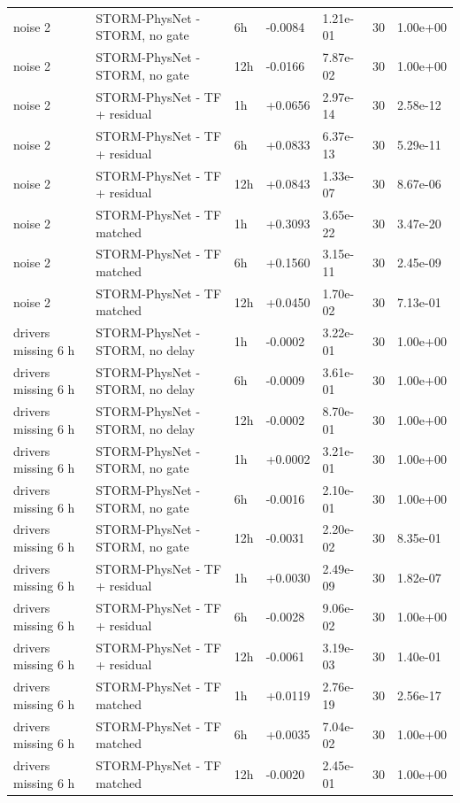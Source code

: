 \begin{tabular}{lllllrl}
noise 2 & STORM-PhysNet - STORM, no gate & 6h & -0.0084 & 1.21e-01 & 30 & 1.00e+00 \\
noise 2 & STORM-PhysNet - STORM, no gate & 12h & -0.0166 & 7.87e-02 & 30 & 1.00e+00 \\
noise 2 & STORM-PhysNet - TF + residual & 1h & +0.0656 & 2.97e-14 & 30 & 2.58e-12 \\
noise 2 & STORM-PhysNet - TF + residual & 6h & +0.0833 & 6.37e-13 & 30 & 5.29e-11 \\
noise 2 & STORM-PhysNet - TF + residual & 12h & +0.0843 & 1.33e-07 & 30 & 8.67e-06 \\
noise 2 & STORM-PhysNet - TF matched & 1h & +0.3093 & 3.65e-22 & 30 & 3.47e-20 \\
noise 2 & STORM-PhysNet - TF matched & 6h & +0.1560 & 3.15e-11 & 30 & 2.45e-09 \\
noise 2 & STORM-PhysNet - TF matched & 12h & +0.0450 & 1.70e-02 & 30 & 7.13e-01 \\
drivers missing 6 h & STORM-PhysNet - STORM, no delay & 1h & -0.0002 & 3.22e-01 & 30 & 1.00e+00 \\
drivers missing 6 h & STORM-PhysNet - STORM, no delay & 6h & -0.0009 & 3.61e-01 & 30 & 1.00e+00 \\
drivers missing 6 h & STORM-PhysNet - STORM, no delay & 12h & -0.0002 & 8.70e-01 & 30 & 1.00e+00 \\
drivers missing 6 h & STORM-PhysNet - STORM, no gate & 1h & +0.0002 & 3.21e-01 & 30 & 1.00e+00 \\
drivers missing 6 h & STORM-PhysNet - STORM, no gate & 6h & -0.0016 & 2.10e-01 & 30 & 1.00e+00 \\
drivers missing 6 h & STORM-PhysNet - STORM, no gate & 12h & -0.0031 & 2.20e-02 & 30 & 8.35e-01 \\
drivers missing 6 h & STORM-PhysNet - TF + residual & 1h & +0.0030 & 2.49e-09 & 30 & 1.82e-07 \\
drivers missing 6 h & STORM-PhysNet - TF + residual & 6h & -0.0028 & 9.06e-02 & 30 & 1.00e+00 \\
drivers missing 6 h & STORM-PhysNet - TF + residual & 12h & -0.0061 & 3.19e-03 & 30 & 1.40e-01 \\
drivers missing 6 h & STORM-PhysNet - TF matched & 1h & +0.0119 & 2.76e-19 & 30 & 2.56e-17 \\
drivers missing 6 h & STORM-PhysNet - TF matched & 6h & +0.0035 & 7.04e-02 & 30 & 1.00e+00 \\
drivers missing 6 h & STORM-PhysNet - TF matched & 12h & -0.0020 & 2.45e-01 & 30 & 1.00e+00 \\

\end{tabular}
